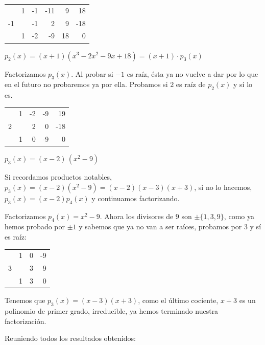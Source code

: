 \begin{miejemplo}
\begin{multicols}{2}
\begin{table}[H]
\centering
\begin{tabular}{r|rrrrr}
 & 1 & -1 & -11 & 9 & 18 \\
-1 &  & -1 & 2 & 9 & -18 \\ \hline
 & 1 & -2 & -9 & \multicolumn{1}{r|}{18} & 0 \\ \cline{6-6} 
\end{tabular}
\end{table}

$p_2(x)=(x+1)(x^3-2x^2-9x+18)=(x+1)\cdot p_3(x)$	
\end{multicols}

Factorizamos $p_3(x)$. Al probar si $-1$ es raíz, ésta ya no vuelve a dar por lo que en el futuro no probaremos ya por ella. Probamos si $2$ es raíz de $p_2(x)$ y sí lo es.

\begin{multicols}{2}
\begin{table}[H]
\centering
\begin{tabular}{r|rrrr}
 & 1 & -2 & -9 & 19 \\
2 &  & 2 & 0 & -18 \\ \hline
 & 1 & 0 & \multicolumn{1}{r|}{-9} & 0 \\ \cline{5-5} 
\end{tabular}
\end{table}	
$p_3(x)=(x-2)\, (x^2-9)$

Si recordamos productos notables, $p_3(x)=(x-2)(x^2-9)=(x-2)(x-3)(x+3)$, si no lo hacemos, $p_3(x)=(x-2)p_4(x)$ y continuamos factorizando.
\end{multicols}

Factorizamos $p_4(x)=x^2-9$. Ahora los divisores de $9$ son $\pm\{1,3,9\}$, como ya hemos probado por $\pm 1$ y sabemos que ya no van a ser raíces, probamos por $3$ y sí es raíz:

\begin{multicols}{2}
\begin{table}[H]
\centering
\begin{tabular}{r|rrr}
 & 1 & 0 & -9 \\
3 &  & 3 & 9 \\ \hline
 & 1 & \multicolumn{1}{r|}{3} & 0 \\ \cline{4-4} 
\end{tabular}
\end{table}	
Tenemos que $p_3(x)=(x-3)(x+3)$, como el último cociente, $x+3$ es un polinomio de primer grado, irreducible, ya hemos terminado nuestra factorización.
\end{multicols}
Reuniendo todos los resultados obtenidos:


\end{miejemplo}
